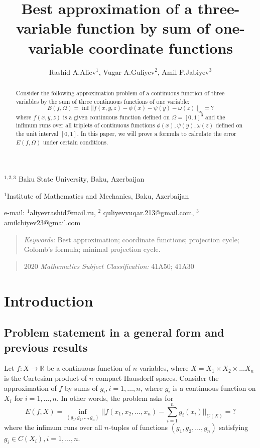 \documentclass[12p]{article}
\title{\textbf{Best approximation of a three-variable function by sum of one-variable coordinate functions}}
\author{Rashid A.Aliev$^{1}$, Vugar A.Guliyev$^{2}$, Amil F.Jabiyev$^{3}$}
\numberwithin{equation}{section}
\begin{document}
\maketitle
\begin{center}

$^{1,2,3}$ {Baku State University, Baku, Azerbaijan}\\
\vspace{1mm}

$^{1}${Institute of Mathematics and Mechanics, Baku, Azerbaijan}\\
\vspace{1mm}


e-mail: $^{1}$aliyevrashid@mail.ru, $^{2}$ quliyevvuqar.213@gmail.com, $^{3}$ amilcbiyev23@gmail.com
\end{center}
\begin{abstract}
    Consider the following approximation problem of a continuous function of three variables by the sum of three continuous functions of one variable:
    \[ E(f,\Omega)=\inf||f(x,y,z)-\phi(x)-\psi(y)-\omega(z)||_{\infty}=? \]
    where $f(x,y,z)$ is a given continuous function defined on $\Omega=[0,1]^3$ and the infimum runs over all triplets of continuous functions $\phi(x),\psi(y),\omega(z)$ defined on the unit interval $[0,1]$. In this paper, we will prove a formula to calculate the error $E(f,\Omega)$ under certain conditions.
\end{abstract}

\begin{quote}\small
{\it Keywords:} Best approximation;  coordinate functions; projection cycle; Golomb’s formula; minimal projection cycle.
\end{quote}

\begin{quote}\small
2020 \textit{ Mathematics Subject Classification: }  41A50; 41A30
\end{quote}

\smallskip

\section{Introduction}

\subsection{Problem statement in a general form and previous results}

Let \(f:X \to \mathbb{R}\) be a continuous function of \(n\) variables, where \(X=X_1\times X_2 \times\dots X_n\) is the Cartesian product of \(n\) compact Hausdorff spaces. Consider the approximation of \(f\) by sums of \(g_i, i=1,\dots,n\), where \(g_i\) is a continuous function on \(X_i\) for \(i=1,\dots,n\). In other words, the problem asks for 
\begin{equation} \label{e: main-problem}
    E(f,X)=\inf_{(g_1,g_2,...,g_n)}||f(x_1,x_2,\dots,x_n)-\sum_{i=1}^ng_i(x_i)||_{C(X)}=?
\end{equation}
where the infimum runs over all \(n\)-tuples of functions \((g_1,g_2,...,g_n)\) satisfying \(g_i \in C(X_i),i=1,\dots,n\).
\end{document}
